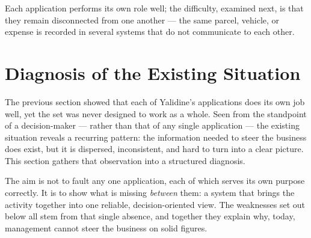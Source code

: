 \endgroup

Each application performs its own role well; the difficulty, examined next, is that they remain
disconnected from one another --- the same parcel, vehicle, or expense is recorded in several systems
that do not communicate to each other.

\section{Diagnosis of the Existing Situation}
\label{sec:ch3-diagnosis}

The previous section showed that each of Yalidine's applications does its own job well, yet the set
was never designed to work as a whole. Seen from the standpoint of a decision-maker --- rather than
that of any single application --- the existing situation reveals a recurring pattern: the information
needed to steer the business does exist, but it is dispersed, inconsistent, and hard to turn into a
clear picture. This section gathers that observation into a structured diagnosis.

The aim is not to fault any one application, each of which serves its own purpose correctly. It is to
show what is missing \emph{between} them: a system that brings the activity together into one
reliable, decision-oriented view. The weaknesses set out below all stem from that single absence, and
together they explain why, today, management cannot steer the business on solid figures.

